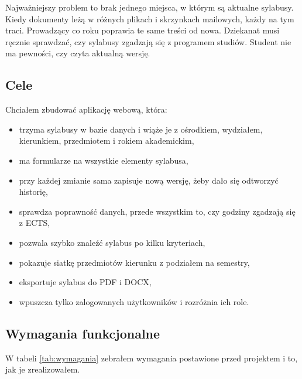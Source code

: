\documentclass[times]{san}
\begin{document}
Najważniejszy problem to brak jednego miejsca, w którym są aktualne sylabusy. Kiedy dokumenty leżą w różnych plikach i skrzynkach mailowych, każdy na tym traci. Prowadzący co roku poprawia te same treści od nowa. Dziekanat musi ręcznie sprawdzać, czy sylabusy zgadzają się z programem studiów. Student nie ma pewności, czy czyta aktualną wersję.

\subsection{Cele}

Chciałem zbudować aplikację webową, która:
\begin{itemize}
  \item trzyma sylabusy w bazie danych i wiąże je z ośrodkiem, wydziałem, kierunkiem, przedmiotem i rokiem akademickim,
  \item ma formularze na wszystkie elementy sylabusa,
  \item przy każdej zmianie sama zapisuje nową wersję, żeby dało się odtworzyć historię,
  \item sprawdza poprawność danych, przede wszystkim to, czy godziny zgadzają się z ECTS,
  \item pozwala szybko znaleźć sylabus po kilku kryteriach,
  \item pokazuje siatkę przedmiotów kierunku z podziałem na semestry,
  \item eksportuje sylabus do PDF i DOCX,
  \item wpuszcza tylko zalogowanych użytkowników i rozróżnia ich role.
\end{itemize}

\subsection{Wymagania funkcjonalne}

W tabeli \ref{tab:wymagania} zebrałem wymagania postawione przed projektem i to, jak je zrealizowałem.
\end{document}
